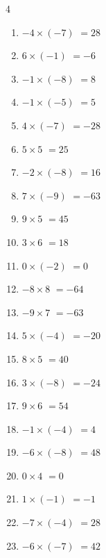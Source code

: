 \begin{multicols}{4}
\begin{enumerate}
  \item $-4\times (-7)$
        $=28$

  \item $6\times (-1)$
        $=-6$

  \item $-1\times (-8)$
        $=8$

  \item $-1\times (-5)$
        $=5$

  \item $4\times (-7)$
        $=-28$

  \item $5\times 5$
        $=25$

  \item $-2\times (-8)$
        $=16$

  \item $7\times (-9)$
        $=-63$

  \item $9\times 5$
        $=45$

  \item $3\times 6$
        $=18$

  \item $0\times (-2)$
        $=0$

  \item $-8\times 8$
        $=-64$

  \item $-9\times 7$
        $=-63$

  \item $5\times (-4)$
        $=-20$

  \item $8\times 5$
        $=40$

  \item $3\times (-8)$
        $=-24$

  \item $9\times 6$
        $=54$

  \item $-1\times (-4)$
        $=4$

  \item $-6\times (-8)$
        $=48$

  \item $0\times 4$
        $=0$

  \item $1\times (-1)$
        $=-1$

  \item $-7\times (-4)$
        $=28$

  \item $-6\times (-7)$
        $=42$


\end{enumerate}
\end{multicols}
